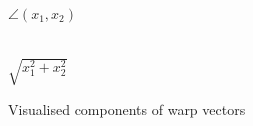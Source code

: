 \documentclass[12pt,a4paper,oneside,openright]{book}
\begin{document}
\begin{CJK}{UTF8}{}
\begin{figure}[htbp]
\begin{center}
    \hspace{.25cm}
    \begin{minipage}[t]{.22\textwidth}
      \begin{center}
        \\
        $\angle(x_1,x_2)$
      \end{center}
    \end{minipage}
    \hspace{.25cm}
    \begin{minipage}[t]{.22\textwidth}
      \begin{center}
        \\
        $\sqrt{x_1^2+x_2^2}$
      \end{center}
    \end{minipage}
    \caption{Visualised components of warp vectors\label{fig:warp}}
  \end{center}

\end{figure}
\end{CJK}
\end{document}
